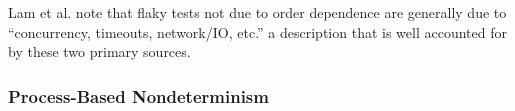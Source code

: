 Lam et al. \cite{idflakies} note that flaky tests not due to order
dependence are generally due to ``concurrency, timeouts,
network/IO, etc.'' a description that is well accounted for by these two
primary sources.

\subsubsection{Process-Based Nondeterminism}

\label{sec:pnondet}

